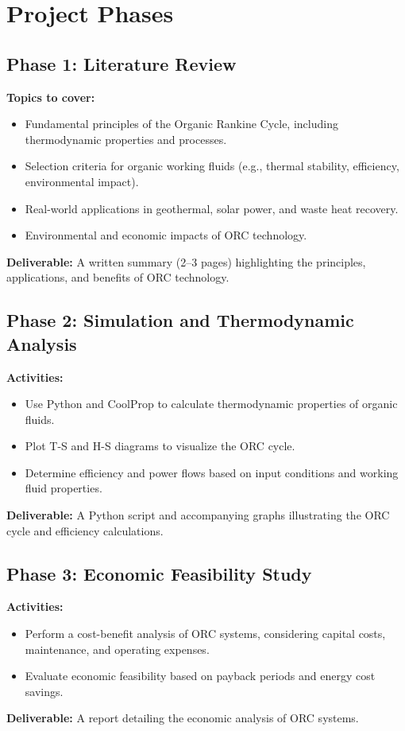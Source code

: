 \documentclass[11pt]{article}
\begin{document}
\section*{Project Phases}

\subsection*{Phase 1: Literature Review}
\textbf{Topics to cover:}
\begin{itemize}
    \item Fundamental principles of the Organic Rankine Cycle, including thermodynamic properties and processes.
    \item Selection criteria for organic working fluids (e.g., thermal stability, efficiency, environmental impact).
    \item Real-world applications in geothermal, solar power, and waste heat recovery.
    \item Environmental and economic impacts of ORC technology.
\end{itemize}
\textbf{Deliverable:} A written summary (2--3 pages) highlighting the principles, applications, and benefits of ORC technology.

\subsection*{Phase 2: Simulation and Thermodynamic Analysis}
\textbf{Activities:}
\begin{itemize}
    \item Use Python and CoolProp to calculate thermodynamic properties of organic fluids.
    \item Plot T-S and H-S diagrams to visualize the ORC cycle.
    \item Determine efficiency and power flows based on input conditions and working fluid properties.
\end{itemize}
\textbf{Deliverable:} A Python script and accompanying graphs illustrating the ORC cycle and efficiency calculations.

\subsection*{Phase 3: Economic Feasibility Study}
\textbf{Activities:}
\begin{itemize}
    \item Perform a cost-benefit analysis of ORC systems, considering capital costs, maintenance, and operating expenses.
    \item Evaluate economic feasibility based on payback periods and energy cost savings.
\end{itemize}
\textbf{Deliverable:} A report detailing the economic analysis of ORC systems.
\end{document}
